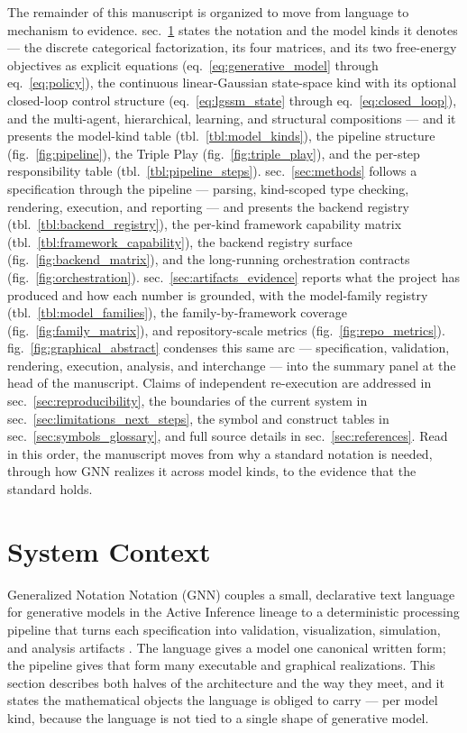 \documentclass[
  english,
  9pt,
]{extarticle}
\begin{document}
The remainder of this manuscript is organized to move from language to
mechanism to evidence. sec.~\ref{sec:system_context} states the notation
and the model kinds it denotes --- the discrete categorical
factorization, its four matrices, and its two free-energy objectives as
explicit equations (eq.~\ref{eq:generative_model} through
eq.~\ref{eq:policy}), the continuous linear-Gaussian state-space kind
with its optional closed-loop control structure
(eq.~\ref{eq:lgssm_state} through eq.~\ref{eq:closed_loop}), and the
multi-agent, hierarchical, learning, and structural compositions --- and
it presents the model-kind table (tbl.~\ref{tbl:model_kinds}), the
pipeline structure (fig.~\ref{fig:pipeline}), the Triple Play
(fig.~\ref{fig:triple_play}), and the per-step responsibility table
(tbl.~\ref{tbl:pipeline_steps}). sec.~\ref{sec:methods} follows a
specification through the pipeline --- parsing, kind-scoped type
checking, rendering, execution, and reporting --- and presents the
backend registry (tbl.~\ref{tbl:backend_registry}), the per-kind
framework capability matrix (tbl.~\ref{tbl:framework_capability}), the
backend registry surface (fig.~\ref{fig:backend_matrix}), and the
long-running orchestration contracts (fig.~\ref{fig:orchestration}).
sec.~\ref{sec:artifacts_evidence} reports what the project has produced
and how each number is grounded, with the model-family registry
(tbl.~\ref{tbl:model_families}), the family-by-framework coverage
(fig.~\ref{fig:family_matrix}), and repository-scale metrics
(fig.~\ref{fig:repo_metrics}). fig.~\ref{fig:graphical_abstract}
condenses this same arc --- specification, validation, rendering,
execution, analysis, and interchange --- into the summary panel at the
head of the manuscript. Claims of independent re-execution are addressed
in sec.~\ref{sec:reproducibility}, the boundaries of the current system
in sec.~\ref{sec:limitations_next_steps}, the symbol and construct
tables in sec.~\ref{sec:symbols_glossary}, and full source details in
sec.~\ref{sec:references}. Read in this order, the manuscript moves from
why a standard notation is needed, through how GNN realizes it across
model kinds, to the evidence that the standard holds.

\newpage

\section{System Context}\label{sec:system_context}

Generalized Notation Notation (GNN) couples a small, declarative text
language for generative models in the Active Inference lineage to a
deterministic processing pipeline that turns each specification into
validation, visualization, simulation, and analysis artifacts
\citep{gnn2023}. The language gives a model one canonical written form;
the pipeline gives that form many executable and graphical realizations.
This section describes both halves of the architecture and the way they
meet, and it states the mathematical objects the language is obliged to
carry --- per model kind, because the language is not tied to a single
shape of generative model.
\end{document}
